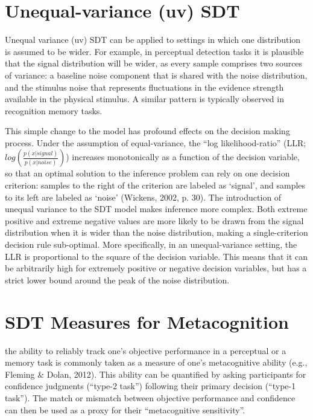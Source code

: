 \documentclass[12pt,twoside]{reedthesis}
\begin{document}
\hypertarget{app1:uvSDT}{%
\section{Unequal-variance (uv) SDT}\label{app1:uvSDT}}

Unequal variance (uv) SDT can be applied to settings in which one distribution is assumed to be wider. For example, in perceptual detection tasks it is plausible that the signal distribution will be wider, as every sample comprises two sources of variance: a baseline noise component that is shared with the noise distribution, and the stimulus noise that represents fluctuations in the evidence strength available in the physical stimulus. A similar pattern is typically observed in recognition memory tasks.

This simple change to the model has profound effects on the decision making process. Under the assumption of equal-variance, the ``log likelihood-ratio'' (LLR; \(log(\frac{p(x|signal)}{p(x|noise)})\)) increases monotonically as a function of the decision variable, so that an optimal solution to the inference problem can rely on one decision criterion: samples to the right of the criterion are labeled as `signal', and samples to its left are labeled as `noise' (Wickens, 2002, p. 30). The introduction of unequal variance to the SDT model makes inference more complex. Both extreme positive and extreme negative values are more likely to be drawn from the signal distribution when it is wider than the noise distribution, making a single-criterion decision rule sub-optimal. More specifically, in an unequal-variance setting, the LLR is proportional to the square of the decision variable. This means that it can be arbitrarily high for extremely positive or negative decision variables, but has a strict lower bound around the peak of the noise distribution.

\hypertarget{app1:mc}{%
\section{SDT Measures for Metacognition}\label{app1:mc}}

the ability to reliably track one's objective performance in a perceptual or a memory task is commonly taken as a measure of one's metacognitive ability (e.g., Fleming \& Dolan, 2012). This ability can be quantified by asking participants for confidence judgments (``type-2 task'') following their primary decision (``type-1 task''). The match or mismatch between objective performance and confidence can then be used as a proxy for their ``metacognitive sensitivity''.
\end{document}
